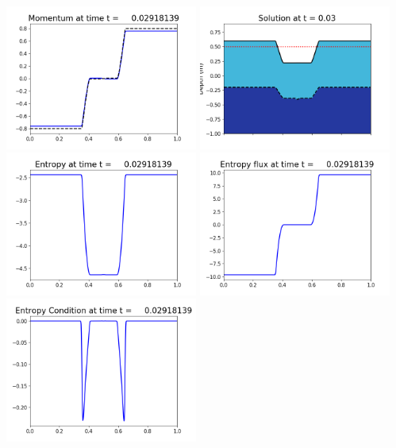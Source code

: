 \documentclass[11pt]{article}
\begin{document}
\vskip 10pt 
\includegraphics[width=0.475\textwidth]{frame0081fig1003.png}
\includegraphics[width=0.475\textwidth]{frame0081fig1006.png}
\vskip 10pt 
\includegraphics[width=0.475\textwidth]{frame0081fig1007.png}
\includegraphics[width=0.475\textwidth]{frame0081fig1008.png}
\vskip 10pt 
\includegraphics[width=0.475\textwidth]{frame0081fig1009.png}
\end{document}
